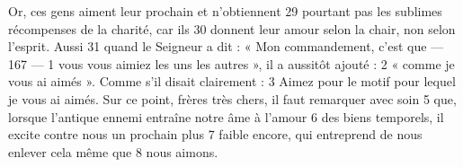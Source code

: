 Or, ces gens aiment leur prochain et n'obtiennent	 
29	 	pourtant pas les sublimes récompenses de la charité, car ils	 
30	 	donnent leur amour selon la chair, non selon l'esprit. Aussi	 
31	 	quand le Seigneur a dit : « Mon commandement, c'est que	 
 	--- 167 ---	 
1	 	vous vous aimiez les uns les autres », il a aussitôt ajouté :	 
2	 	« comme je vous ai aimés ». Comme s'il disait clairement :	 
3	 	Aimez pour le motif pour lequel je vous ai aimés.
Sur ce point, frères très chers, il faut remarquer avec soin	 
5	 	que, lorsque l'antique ennemi entraîne notre âme à l'amour	 
6	 	des biens temporels, il excite contre nous un prochain plus	 
7	 	faible encore, qui entreprend de nous enlever cela même que	 
8	 	nous aimons.